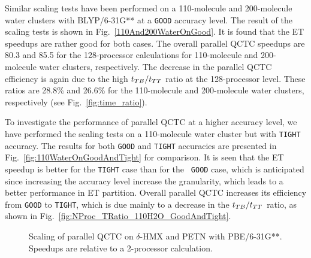 \commentoutA{\documentclass[prl,aps,twocolumn,twocolumngrid,superbib]{revtex4}}
\begin{document}
Similar scaling tests have been performed on a 110-molecule and
200-molecule water clusters with BLYP/6-31G** at a {\tt GOOD} accuracy
level.  The result of the scaling tests is shown in
Fig.~\ref{110And200WaterOnGood}. It is found that the ET speedups are
rather good for both cases. The overall parallel QCTC speedups are
80.3 and 85.5 for the 128-processor calculations for 110-molecule and
200-molecule water clusters, respectively.
The decrease in the parallel QCTC efficiency is again due to the
high $t_{TB}/t_{TT}$ ratio at the 128-processor level. These ratios are
28.8\% and 26.6\% for the 110-molecule and 200-molecule water
clusters, respectively (see Fig.~\ref{fig:time_ratio}).

To investigate the performance of parallel QCTC at a higher accuracy
level, we have performed the scaling tests on a 110-molecule water
cluster but with {\tt TIGHT} accuracy. The results for both {\tt GOOD}
and {\tt TIGHT} accuracies are presented in
Fig.~\ref{fig:110WaterOnGoodAndTight} for comparison.  It is seen that
the ET speedup is better for the {\tt TIGHT} case than for the {\tt
GOOD} case, which is anticipated since increasing the accuracy level
increase the granularity, which leads to a better performance in ET
partition\cite{CGan03}.  Overall parallel QCTC increases its
efficiency from {\tt GOOD} to {\tt TIGHT}, which is due mainly to a
decrease in the $t_{TB}/t_{TT}$ ratio, as shown in
Fig.~\ref{fig:NProc_TRatio_110H2O_GoodAndTight}.


\begin{figure}[t]
\caption{ 
Scaling of parallel QCTC on $\delta$-HMX and PETN with PBE/6-31G**.
Speedups are relative to a 2-processor calculation.  }
\label{fig:111DHMX212PETN}
\end{figure}
\end{document}
